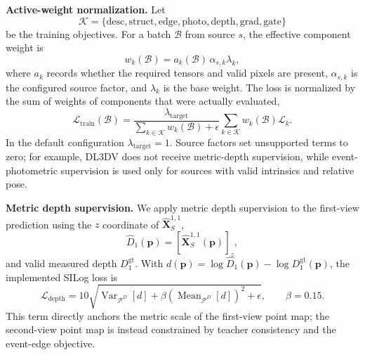 \noindent\textbf{Active-weight normalization.}
Let
\begin{equation}
\mathcal{K}
=\{\mathrm{desc},\mathrm{struct},\mathrm{edge},\mathrm{photo},
\mathrm{depth},\mathrm{grad},\mathrm{gate}\}
\end{equation}
be the training objectives.  For a batch $\mathcal{B}$ from source $s$,
the effective component weight is
\begin{equation}
w_k(\mathcal{B})
=a_k(\mathcal{B})\,\alpha_{s,k}\lambda_k,
\label{eq:effective_loss_weight}
\end{equation}
where $a_k$ records whether the required tensors and valid pixels are present,
$\alpha_{s,k}$ is the configured source factor, and $\lambda_k$ is the base
weight.  The loss is normalized by the sum of weights of components that were
actually evaluated,
\begin{equation}
\mathcal{L}_{\mathrm{train}}(\mathcal{B})
=\frac{\lambda_{\mathrm{target}}}
{\sum_{k\in\mathcal{K}}w_k(\mathcal{B})+\epsilon}
\sum_{k\in\mathcal{K}}
w_k(\mathcal{B})\mathcal{L}_k.
\label{eq:dynamic_loss}
\end{equation}
In the default configuration $\lambda_{\mathrm{target}}=1$.  Source factors
set unsupported terms to zero; for example, DL3DV does not receive metric-depth
supervision, while event-photometric supervision is used only for sources with
valid intrinsics and relative pose.

\vspace{+5pt}
\noindent\textbf{Metric depth supervision.}
We apply metric depth supervision to the first-view prediction using the $z$
coordinate of
$\hat{\mathbf{X}}_{S}^{1,1}$,
\begin{equation}
\hat D_1(\mathbf{p})
=\left[\hat{\mathbf{X}}_{S}^{1,1}(\mathbf{p})\right]_z,
\end{equation}
and valid measured depth $D_1^{\mathrm{gt}}$.  With
$d(\mathbf{p})=\log\hat D_1(\mathbf{p})-\log D_1^{\mathrm{gt}}(\mathbf{p})$,
the implemented SILog loss is
\begin{equation}
\mathcal{L}_{\mathrm{depth}}
=10\sqrt{
\operatorname{Var}_{\mathcal{P}^{D}}[d]
+\beta\left(
\operatorname{Mean}_{\mathcal{P}^{D}}[d]
\right)^2
+\epsilon},
\qquad \beta=0.15.
\label{eq:metric_depth_loss}
\end{equation}
This term directly anchors the metric scale of the first-view point map; the
second-view point map is instead constrained by teacher consistency and the
event-edge objective.

